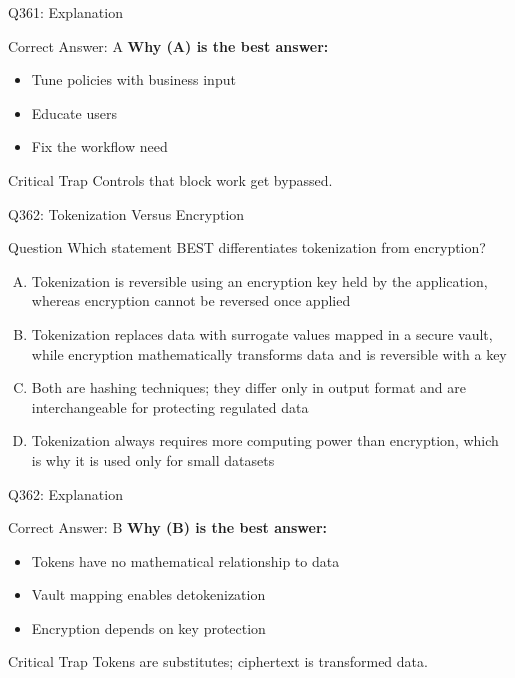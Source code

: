 \documentclass{beamer}
\begin{document}
	\begin{frame}{Q361: Explanation}
		\begin{block}{Correct Answer: A}
			\textbf{Why (A) is the best answer:}
			\begin{itemize}
				\item Tune policies with business input
				\item Educate users
				\item Fix the workflow need
			\end{itemize}
		\end{block}
		\begin{alertblock}{Critical Trap}
			Controls that block work get bypassed.
		\end{alertblock}
	\end{frame}
	
	\begin{frame}{Q362: Tokenization Versus Encryption}
		\begin{block}{Question}
			\small Which statement BEST differentiates tokenization from encryption?
		\end{block}
		\begin{enumerate}[(A)]
			\footnotesize
			\item Tokenization is reversible using an encryption key held by the application, whereas encryption cannot be reversed once applied
			\item Tokenization replaces data with surrogate values mapped in a secure vault, while encryption mathematically transforms data and is reversible with a key
			\item Both are hashing techniques; they differ only in output format and are interchangeable for protecting regulated data
			\item Tokenization always requires more computing power than encryption, which is why it is used only for small datasets
		\end{enumerate}
	\end{frame}
	
	\begin{frame}{Q362: Explanation}
		\begin{block}{Correct Answer: B}
			\textbf{Why (B) is the best answer:}
			\begin{itemize}
				\item Tokens have no mathematical relationship to data
				\item Vault mapping enables detokenization
				\item Encryption depends on key protection
			\end{itemize}
		\end{block}
		\begin{alertblock}{Critical Trap}
			Tokens are substitutes; ciphertext is transformed data.
		\end{alertblock}
	\end{frame}
	
\end{document}
